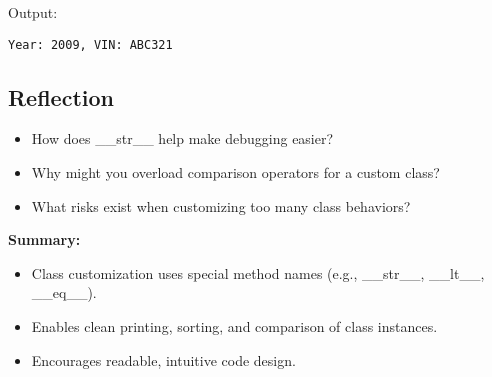\noindent Output:
\begin{verbatim}
Year: 2009, VIN: ABC321
\end{verbatim}

\subsection*{Reflection}

\begin{itemize}
\item How does \_\_str\_\_ help make debugging easier?
\item Why might you overload comparison operators for a custom class?
\item What risks exist when customizing too many class behaviors?
\end{itemize}

\noindent\textbf{Summary:}
\begin{itemize}
\item Class customization uses special method names (e.g., \_\_str\_\_, \_\_lt\_\_, \_\_eq\_\_).
\item Enables clean printing, sorting, and comparison of class instances.
\item Encourages readable, intuitive code design.
\end{itemize}

